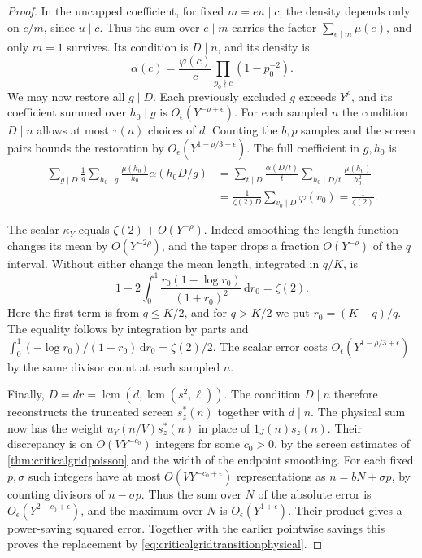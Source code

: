 \documentclass[11pt,a4paper]{article}
\numberwithin{equation}{section}
\newcommand{\ud}{\mathrm d}
\begin{document}
\begin{proof}
In the uncapped coefficient, for fixed $m=eu\mid c$,
the density depends only on $c/m$, since $u\mid c$.
Thus the sum over $e\mid m$ carries the factor
$\sum_{e\mid m}\mu(e)$, and only $m=1$ survives.
Its condition is $D\mid n$, and its density is
\[
 \alpha(c)=\frac{\varphi(c)}c\prod_{p_0\nmid c}(1-p_0^{-2}).
\]
We may now restore all $g\mid D$. Each previously
excluded $g$ exceeds $Y^\rho$, and its coefficient
summed over $h_0\mid g$ is $O_\epsilon(Y^{-\rho+\epsilon})$.
For each sampled $n$ the condition $D\mid n$ allows at
most $\tau(n)$ choices of $d$. Counting the $b,p$
samples and the screen pairs bounds the restoration
by $O_\epsilon(Y^{1-\rho/3+\epsilon})$.
The full coefficient in $g,h_0$ is
\begin{align*}
 \sum_{g\mid D}\frac1g
      \sum_{h_0\mid g}\frac{\mu(h_0)}{h_0}\alpha(h_0 D/g)
 &=\sum_{t\mid D}\frac{\alpha(D/t)}t
                     \sum_{h_0\mid D/t}\frac{\mu(h_0)}{h_0^2}\\
 &=\frac{1}{\zeta(2)D}\sum_{v_0\mid D}\varphi(v_0)
 =\frac1{\zeta(2)}.
\end{align*}

The scalar $\kappa_Y$ equals $\zeta(2)+O(Y^{-\rho})$.
Indeed smoothing the length function changes its mean
by $O(Y^{-2\rho})$, and the taper drops a fraction
$O(Y^{-\rho})$ of the $q$ interval.
Without either change the mean length, integrated
in $q/K$, is
\[
 1+2\int_0^1\frac{r_0(1-\log r_0)}{(1+r_0)^2}\,\ud r_0
      =\zeta(2).
\]
Here the first term is from $q\le K/2$, and for
$q>K/2$ we put $r_0=(K-q)/q$.
The equality follows by integration by parts and
$\int_0^1(-\log r_0)/(1+r_0)\,\ud r_0=\zeta(2)/2$.
The scalar error costs $O_\epsilon(Y^{1-\rho/3+\epsilon})$
by the same divisor count at each sampled $n$.

Finally, $D=dr=\operatorname{lcm}(d,\operatorname{lcm}(s^2,\ell))$.
The condition $D\mid n$ therefore reconstructs the
truncated screen $s_z^*(n)$ together with $d\mid n$.
The physical sum now has the weight
$u_Y(n/V)s_z^*(n)$ in place of $1_J(n)s_z(n)$.
Their discrepancy is on $O(VY^{-c_0})$ integers
for some $c_0>0$, by the screen estimates of
\cref{thm:criticalgridpoisson} and the width of the
endpoint smoothing. For each fixed $p,\sigma$ such
integers have at most $O(VY^{-c_0+\epsilon})$ representations
as $n=bN+\sigma p$, by counting divisors of $n-\sigma p$.
Thus the sum over $N$ of the absolute error is
$O_\epsilon(Y^{2-c_0+\epsilon})$, and the maximum
over $N$ is $O_\epsilon(Y^{1+\epsilon})$.
Their product gives a power-saving squared error.
Together with the earlier pointwise savings this
proves the replacement by \cref{eq:criticalgridtransitionphysical}.
\end{proof}
\end{document}
